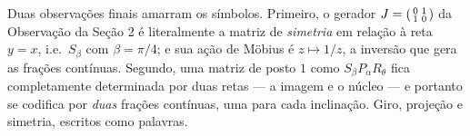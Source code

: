 \documentclass[11pt,a4paper]{article}
\theoremstyle{plain}
\theoremstyle{definition}
\theoremstyle{remark}
\begin{document}
Duas observações finais amarram os símbolos. Primeiro, o gerador $J=\begin{psmallmatrix}0&1\\1&0
\end{psmallmatrix}$ da Observação da Seção 2 é literalmente a matriz de \emph{simetria} em relação
à reta $y=x$, i.e.\ $S_\beta$ com $\beta = \pi/4$; e sua ação de Möbius é $z \mapsto 1/z$, a
inversão que gera as frações contínuas. Segundo, uma matriz de posto $1$ como
$S_\beta P_\alpha R_\theta$ fica completamente determinada por duas retas --- a imagem e o núcleo
--- e portanto se codifica por \emph{duas} frações contínuas, uma para cada inclinação. Giro,
projeção e simetria, escritos como palavras.
\end{document}
